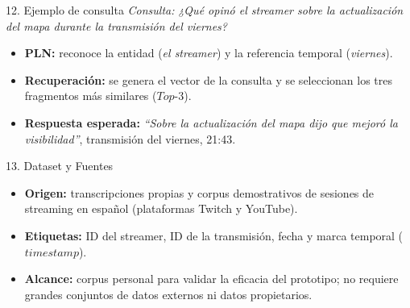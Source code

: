 \documentclass[12pt,a4paper]{article}
\begin{document}
\begin{minipage}[t]{0.485\linewidth}

  \begin{cajapln}{12. Ejemplo de consulta}
    \textit{Consulta:} \emph{\guillemotleft ¿Qué opinó el streamer sobre la actualización del mapa durante la transmisión del viernes?\guillemotright}
    \begin{itemize}
      \item \textbf{PLN:} reconoce la entidad (\emph{el streamer}) y la referencia temporal (\emph{viernes}).
      \item \textbf{Recuperación:} se genera el vector de la consulta y se seleccionan los tres fragmentos más similares ($Top\text{-}3$).
      \item \textbf{Respuesta esperada:} \emph{``Sobre la actualización del mapa dijo que mejoró la visibilidad''}, transmisión del viernes, 21:43.
    \end{itemize}
  \end{cajapln}

  \vspace{10pt}

  \begin{cajapln}{13. Dataset y Fuentes}
    \begin{itemize}
      \item \textbf{Origen:} transcripciones propias y corpus demostrativos de sesiones de streaming en español (plataformas Twitch y YouTube).
      \item \textbf{Etiquetas:} ID del streamer, ID de la transmisión, fecha y marca temporal ($timestamp$).
      \item \textbf{Alcance:} corpus personal para validar la eficacia del prototipo; no requiere grandes conjuntos de datos externos ni datos propietarios.
    \end{itemize}
  \end{cajapln}

\end{minipage}\hfill
\end{document}
